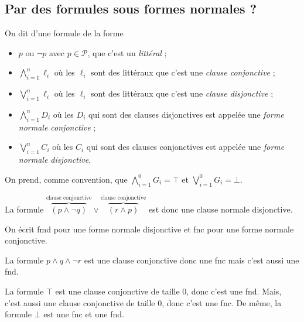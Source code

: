 \subsection{Par des formules sous formes normales ?}

\begin{defn}
	On dit d'une formule de la forme
	\begin{itemize}
		\item $p$\/ ou $\lnot p$\/ avec $p \in \mathcal{P}$, que c'est un {\it littéral}\/ ;
		\item $\bigwedge_{i=1}^n \ell_i$\/ où les $\ell_i$\/ sont des littéraux que c'est une {\it clause conjonctive}\/ ;
		\item $\bigvee_{i=1}^n \ell_i$\/ où les $\ell_i$\/ sont des littéraux que c'est une {\it clause disjonctive}\/ ;
		\item $\bigwedge_{i=1}^n D_i$\/ où les $D_i$\/ qui sont des clauses disjonctives est appelée une {\it forme normale conjonctive}\/ ;
		\item $\bigvee_{i=1}^n C_i$\/ où les $C_i$\/ qui sont des clauses conjonctives est appelée une {\it forme normale disjonctive}.
	\end{itemize}
\end{defn}

\begin{rmk}
	On prend, comme convention, que $\bigwedge_{i=1}^0 G_i = \top$\/ et $\bigvee_{i=1}^0 G_i = \bot$.
\end{rmk}

\begin{exm}
	La formule $\overbrace{(p \land \lnot q)}^{\text{clause conjonctive}} \lor \overbrace{(r \land p)}^{\text{clause conjonctive}}$\/ est donc une clause normale disjonctive.
\end{exm}

\begin{rmk}
	On écrit {\sc fmd}\/ pour une forme normale disjonctive et {\sc fnc}\/ pour une forme normale conjonctive.
\end{rmk}

\begin{exm}
	La formule $p \land q \land\lnot r$\/ est une clause conjonctive donc une {\sc fnc}\/ mais c'est aussi une {\sc fnd}.
\end{exm}

\begin{exm}
	La formule $\top $\/ est une clause conjonctive de taille 0, donc c'est une {\sc fnd}. Mais, c'est aussi une clause conjonctive de taille 0, donc c'est une {\sc fnc}. De même, la formule $\bot$\/ est une {\sc fnc}\/ et une {\sc fnd}.
\end{exm}

